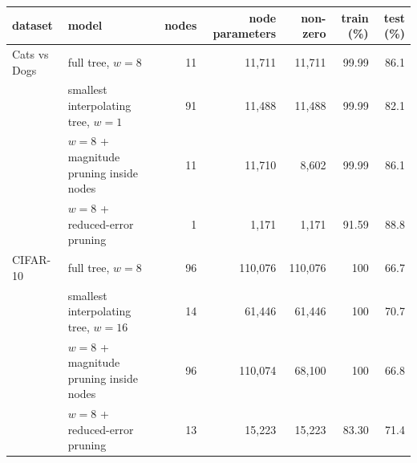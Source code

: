 \begin{tabular}{@{}l l r r r r r@{}}
\toprule
dataset & model & nodes & node parameters & non-zero & train (\%) & test (\%)\\
\midrule
Cats vs Dogs & full tree, $w=8$ & 11 & 11{,}711 & 11{,}711 & 99.99 & 86.1\\
 & smallest interpolating tree, $w=1$ & 91 & 11{,}488 & 11{,}488 & 99.99 & 82.1\\
 & $w=8$ + magnitude pruning inside nodes & 11 & 11{,}710 & 8{,}602 & 99.99 & 86.1\\
 & $w=8$ + reduced-error pruning & 1 & 1{,}171 & 1{,}171 & 91.59 & 88.8\\
\addlinespace
CIFAR-10 & full tree, $w=8$ & 96 & 110{,}076 & 110{,}076 & 100 & 66.7\\
 & smallest interpolating tree, $w=16$ & 14 & 61{,}446 & 61{,}446 & 100 & 70.7\\
 & $w=8$ + magnitude pruning inside nodes & 96 & 110{,}074 & 68{,}100 & 100 & 66.8\\
 & $w=8$ + reduced-error pruning & 13 & 15{,}223 & 15{,}223 & 83.30 & 71.4\\
\bottomrule
\end{tabular}
